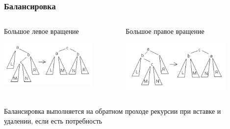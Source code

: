 \documentclass[xetex,mathserif,serif]{beamer}
\begin{document}
	\begin{frame}
		\frametitle{Балансировка}
		\begin{columns}
			\begin{column}{0.5\textwidth}
				Большое левое вращение
				\begin{center}
					\includegraphics[width=0.8\textwidth]{big-left-rotation.png}
				\end{center}
			\end{column}
			\begin{column}{0.5\textwidth}
				Большое правое вращение
				\begin{center}
					\includegraphics[width=0.8\textwidth]{big-right-rotation.png}
				\end{center}
			\end{column}
		\end{columns}
		Балансировка выполняется на обратном проходе рекурсии при вставке и удалении, если есть потребность
	\end{frame}
\end{document}
